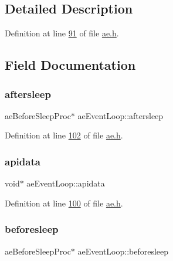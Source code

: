 \subsection{Detailed Description}


Definition at line \hyperlink{ae_8h_source_l00091}{91} of file \hyperlink{ae_8h_source}{ae.\+h}.



\subsection{Field Documentation}
\mbox{\label{structaeEventLoop_ae28e7719da59d474c1aa85527ab744e9}} 
\subsubsection{\texorpdfstring{aftersleep}{aftersleep}}
{\footnotesize\ttfamily ae\+Before\+Sleep\+Proc$\ast$ ae\+Event\+Loop\+::aftersleep}



Definition at line \hyperlink{ae_8h_source_l00102}{102} of file \hyperlink{ae_8h_source}{ae.\+h}.

\mbox{\label{structaeEventLoop_a6e5405d4ffa2492794fa74ee4cf6fb49}} 
\subsubsection{\texorpdfstring{apidata}{apidata}}
{\footnotesize\ttfamily void$\ast$ ae\+Event\+Loop\+::apidata}



Definition at line \hyperlink{ae_8h_source_l00100}{100} of file \hyperlink{ae_8h_source}{ae.\+h}.

\mbox{\label{structaeEventLoop_ae65cc21b6c2f11a2de8e6e62fa660a79}} 
\subsubsection{\texorpdfstring{beforesleep}{beforesleep}}
{\footnotesize\ttfamily ae\+Before\+Sleep\+Proc$\ast$ ae\+Event\+Loop\+::beforesleep}



